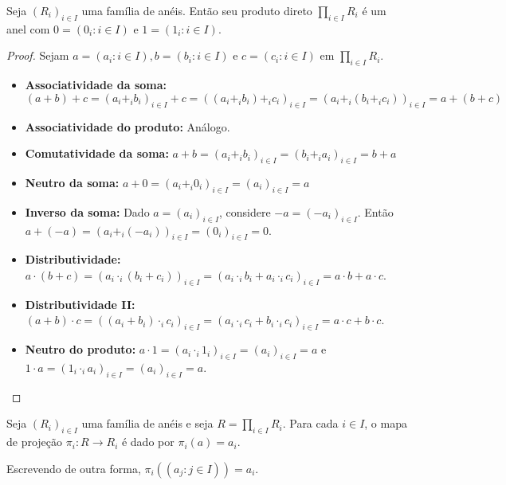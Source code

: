 \begin{lemma}
    Seja $(R_i)_{i \in I}$ uma família de anéis. Então seu produto direto $\prod_{i \in I}R_i$ é um anel com $0=(0_i: i \in I)$ e $1=(1_i: i \in I)$.
\end{lemma}

\begin{proof}
    Sejam $a=(a_i: i \in I), b=(b_i: i \in I)$ e $c=(c_i: i \in I)$ em $\prod_{i \in I}R_i$.
    \begin{itemize}
        \item \textbf{Associatividade da soma:} $(a+b)+c=(a_i+_i b_i)_{i \in I}+c=((a_i+_i b_i)+_ic_i)_{i \in I}=(a_i+_i (b_i+_i c_i))_{i \in I}=a+(b+c)$
        \item \textbf{Associatividade do produto:} Análogo.
        \item \textbf{Comutatividade da soma:} $a+b=(a_i+_i b_i)_{i \in I}=(b_i+_i a_i)_{i \in I}=b+a$
        \item \textbf{Neutro da soma:} $a+0=(a_i+_i 0_i)_{i \in I}=(a_i)_{i \in I}=a$
        \item \textbf{Inverso da soma:} Dado $a=(a_i)_{i \in I}$, considere $-a=(-a_i)_{i \in I}$. Então $a+(-a)=(a_i+_i (-a_i))_{i \in I}=(0_i)_{i \in I}=0$.
        \item \textbf{Distributividade:} $a\cdot (b+c)=(a_i\cdot _i (b_i+c_i))_{i \in I}=(a_i\cdot _i b_i+a_i\cdot _i c_i)_{i \in I}=a\cdot b+a\cdot c$.
        \item \textbf{Distributividade II:} $(a+b)\cdot c=((a_i+b_i)\cdot _i c_i)_{i \in I}=(a_i\cdot _i c_i+b_i\cdot _i c_i)_{i \in I}=a\cdot c+b\cdot c$.
        \item \textbf{Neutro do produto:} $a\cdot 1=(a_i\cdot _i 1_i)_{i \in I}=(a_i)_{i \in I}=a$ e $1\cdot a=(1_i\cdot _i a_i)_{i \in I}=(a_i)_{i \in I}=a$.
    \end{itemize}
\end{proof}
\begin{definition}
    Seja $(R_i)_{i \in I}$ uma família de anéis e seja $R=\prod_{i \in I}R_i$. Para cada $i \in I$, o mapa de projeção $\pi_i:R\rightarrow R_i$ é dado por $\pi_i(a)=a_i$.

    Escrevendo de outra forma, $\pi_i((a_j: j \in I))=a_i$.
\end{definition}

